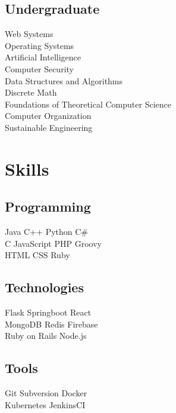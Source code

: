 \documentclass[letterpaper]{deedy-resume} %
\begin{document}
\begin{minipage}[t]{0.33\textwidth}
\subsection{Undergraduate}

Web Systems \\
Operating Systems \\
Artificial Intelligence \\
Computer Security \\
Data Structures and Algorithms \\
Discrete Math \\
Foundations of Theoretical Computer Science \\
Computer Organization \\
Sustainable Engineering \\


\sectionspace %


\section{Skills}

\subsection{Programming}

Java \textbullet{} C++ \textbullet{} Python \textbullet{} C\# \\
C \textbullet{} JavaScript \textbullet{} PHP \textbullet{} Groovy \\
\textbullet{} HTML \textbullet{} CSS \textbullet{} Ruby \\

\subsection{Technologies}
Flask \textbullet{} Springboot \textbullet{} React \\
\textbullet{} MongoDB \textbullet{} Redis \textbullet{} Firebase \\
\textbullet{} Ruby on Rails \textbullet{} Node.js \\
\subsection{Tools}
Git \textbullet{} Subversion \textbullet{} Docker \\
\textbullet{} Kubernetes \textbullet{} JenkinsCI  \\

\sectionspace %


\end{minipage} %
\end{document}
